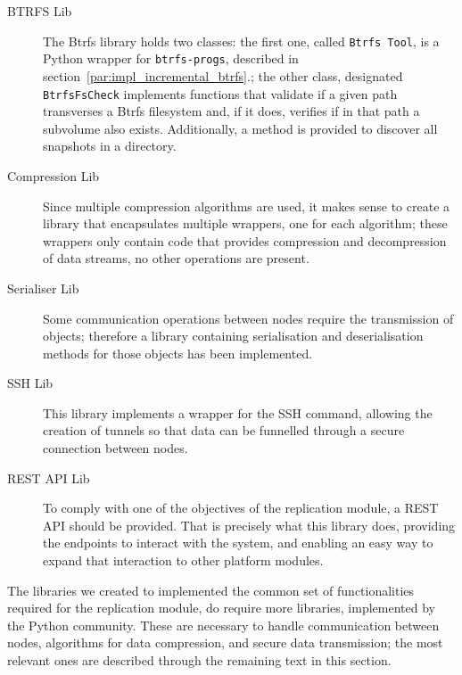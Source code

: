 \begin{description}
	\item [BTRFS Lib] The Btrfs library holds two classes: the first one, called \texttt{Btrfs Tool}, is a Python wrapper for \texttt{btrfs-progs}, described in section~\ref{par:impl_incremental_btrfs}.; the other class, designated \texttt{BtrfsFsCheck} implements functions that validate if a given path transverses a Btrfs filesystem and, if it does, verifies if in that path a subvolume also exists. Additionally, a method is provided to discover all snapshots in a directory.
	\item [Compression Lib] Since multiple compression algorithms are used, it makes sense to create a library that encapsulates multiple wrappers, one for each algorithm; these wrappers only contain code that provides compression and decompression of data streams, no other operations are present.
	\item [Serialiser Lib] Some communication operations between nodes require the transmission of objects; therefore a library containing serialisation and deserialisation methods for those objects has been implemented.
	\item [SSH Lib] This library implements a wrapper for the SSH command, allowing the creation of tunnels so that data can be funnelled through a secure connection between nodes.
	\item [REST API Lib] To comply with one of the objectives of the replication module, a REST API should be provided. That is precisely what this library does, providing the endpoints to interact with the system, and enabling an easy way to expand that interaction to other platform modules.
\end{description}


The libraries we created to implemented the common set of functionalities required for the replication module, do require more libraries, implemented by the Python community. These are necessary to handle communication between nodes, algorithms for data compression, and secure data transmission; the most relevant ones are described through the remaining text in this section.

